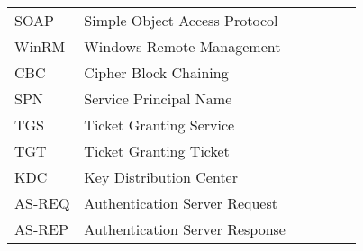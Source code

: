 \begin{flushleft}
\begin{tabular}{l p{0.8\linewidth}}
SOAP     & Simple Object Access Protocol\\
WinRM    & Windows Remote Management\\
CBC      & Cipher Block Chaining\\
SPN      & Service Principal Name\\
TGS      & Ticket Granting Service\\
TGT      & Ticket Granting Ticket\\
KDC      & Key Distribution Center\\
AS-REQ   & Authentication Server Request\\
AS-REP   & Authentication Server Response\\
\end{tabular}
\end{flushleft}